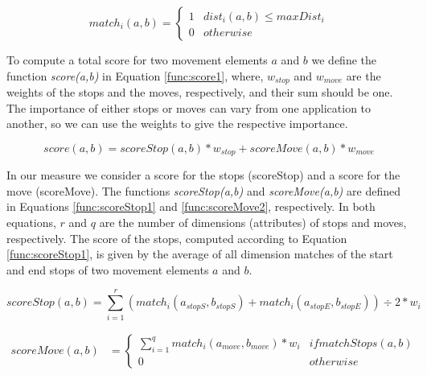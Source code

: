 \documentclass[12pt]{article}
\begin{document}
\begin{equation}
\label{func:match1}
  match_i(a, b) = 
  \begin{cases} 
      1 & dist_i(a, b) \leq maxDist_i \\
      0 & otherwise
  \end{cases}
\end{equation}

To compute a total score for two movement elements $a$ and $b$ we define the function \emph{score(a,b)} in Equation \ref{func:score1}, where, $w_{stop}$ and $w_{move}$ are the weights of the stops and the moves, respectively, and their sum should be one. The importance of either stops or moves can vary from one application to another, so we can use the weights to give the respective importance. 


\begin{equation}
\label{func:score1}
score(a, b) = scoreStop(a, b) * w_{stop} + scoreMove(a, b) * w_{move}  
\end{equation}


In our measure we consider a score for the stops (scoreStop) and a score for the move (scoreMove). The functions \emph{scoreStop(a,b)} and \emph{scoreMove(a,b)} are defined in Equations \ref{func:scoreStop1} and \ref{func:scoreMove2}, respectively. In both equations, $r$ and $q$ are the number of dimensions (attributes) of stops and moves, respectively. The score of the stops, computed according to Equation \ref{func:scoreStop1}, is given by the average of all dimension matches of the start and end stops of two movement elements $a$ and $b$. 


\begin{equation}
\label{func:scoreStop1}
  scoreStop(a, b) = \sum\limits_{i=1}^r (match_i(a_{stopS}, b_{stopS}) + match_i(a_{stopE}, b_{stopE}))\div 2* w_{i}
\end{equation}


\begin{equation}
\label{func:scoreMove2}
\begin{split}
scoreMove(a, b)  & = 
  \begin{cases} 
      \sum\limits_{i=1}^q match_i(a_{move}, b_{move}) * w_{i} & if matchStops(a, b)\\
      0 & otherwise
  \end{cases}
\end{split}
\end{equation}
\end{document}
